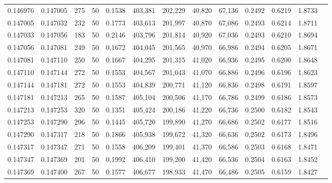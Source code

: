 \begin{tabular}{rrrrrrrrrrrrr}
0.146976 & 0.147005 &   275 &  50 &                                     0.1538 & 403,381 & 202,229 &  40,820 &  67,136 & 0.2492 & 0.6219 & 1.8733 \\
0.147005 & 0.147032 &   232 &  50 &                                     0.1773 & 403,613 & 201,997 &  40,870 &  67,086 & 0.2493 & 0.6214 & 1.8711 \\
0.147033 & 0.147056 &   183 &  50 &                                     0.2146 & 403,796 & 201,814 &  40,920 &  67,036 & 0.2493 & 0.6210 & 1.8694 \\
0.147056 & 0.147081 &   249 &  50 &                                     0.1672 & 404,045 & 201,565 &  40,970 &  66,986 & 0.2494 & 0.6205 & 1.8671 \\
0.147081 & 0.147110 &   250 &  50 &                                     0.1667 & 404,295 & 201,315 &  41,020 &  66,936 & 0.2495 & 0.6200 & 1.8648 \\
0.147110 & 0.147144 &   272 &  50 &                                     0.1553 & 404,567 & 201,043 &  41,070 &  66,886 & 0.2496 & 0.6196 & 1.8623 \\
0.147144 & 0.147181 &   272 &  50 &                                     0.1553 & 404,839 & 200,771 &  41,120 &  66,836 & 0.2498 & 0.6191 & 1.8597 \\
0.147181 & 0.147213 &   265 &  50 &                                     0.1587 & 405,104 & 200,506 &  41,170 &  66,786 & 0.2499 & 0.6186 & 1.8573 \\
0.147213 & 0.147253 &   320 &  50 &                                     0.1351 & 405,424 & 200,186 &  41,220 &  66,736 & 0.2500 & 0.6182 & 1.8543 \\
0.147253 & 0.147290 &   296 &  50 &                                     0.1445 & 405,720 & 199,890 &  41,270 &  66,686 & 0.2502 & 0.6177 & 1.8516 \\
0.147290 & 0.147317 &   218 &  50 &                                     0.1866 & 405,938 & 199,672 &  41,320 &  66,636 & 0.2502 & 0.6173 & 1.8496 \\
0.147317 & 0.147347 &   271 &  50 &                                     0.1558 & 406,209 & 199,401 &  41,370 &  66,586 & 0.2503 & 0.6168 & 1.8471 \\
0.147347 & 0.147369 &   201 &  50 &                                     0.1992 & 406,410 & 199,200 &  41,420 &  66,536 & 0.2504 & 0.6163 & 1.8452 \\
0.147369 & 0.147400 &   267 &  50 &                                     0.1577 & 406,677 & 198,933 &  41,470 &  66,486 & 0.2505 & 0.6159 & 1.8427 \\

\end{tabular}
